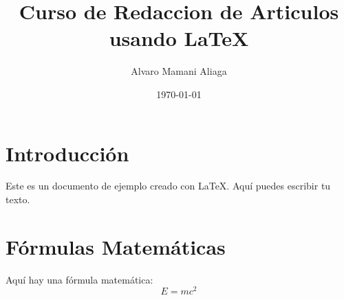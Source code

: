 \documentclass{article}
\title{Curso de Redaccion de Articulos usando LaTeX}
\author{Alvaro Mamani Aliaga}
\date{\today}
\begin{document}
 

\maketitle  

\section{Introducción} 
Este es un documento de ejemplo creado con LaTeX. Aquí puedes escribir tu texto.

\section{Fórmulas Matemáticas} 
Aquí hay una fórmula matemática:
\[
E = mc^2
\]
\end{document}
